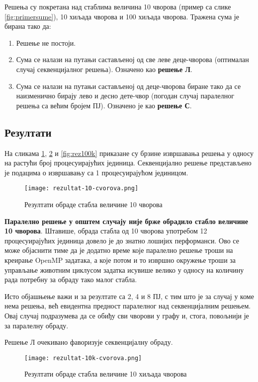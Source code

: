 Решења су покретана над стаблима величина 10 чворова (пример са слике \ref{fig:primersume}), 10 хиљада чворова и 100 хиљада чворова.
Тражена сума је бирана тако да:
\begin{enumerate}
    \item Решење не постоји.
    \item Сума се налази на путањи састављеној од све леве деце-чворова (оптималан случај секвенцијалног решења). Означено као \textbf{решење Л}.
    \item Сума се налази на путањи састављеној од деце-чворова биране тако да се наизменично бирају лево и десно дете-чвор (погодан случај паралелног решења са већим бројем ПЈ).
    Означено је као \textbf{решење С}.
\end{enumerate}

\subsection{Резултати}

На сликама \ref{fig:rez10}, \ref{fig:rez10k} и \ref{fig:rez100k} приказане су брзине извршавања решења у односу на растући број процесуирајућих јединица.
Секвенцијално решење представљено је подацима о извршавању са 1 процесуирајућом јединицом.

\begin{figure}[]
    \centering
    \texttt{[image: rezultat-10-cvorova.png]}
    \caption{Резултати обраде стабла величине 10 чворова}
    \label{fig:rez10}
\end{figure}

\textbf{Паралелно решење у општем случају није брже обрадило стабло величине 10 чворова}.
Штавише, обрада стабла од 10 чворова употребом 12 процесуирајућих јединица довело је до знатно лошијих перформанси.
Ово се може објаснити тиме да је додатно време које паралелно решење троши на креирање OpenMP задатака, а које потом и то извршно окружење троши за
управљање животним циклусом задатка исувише велико у односу на количину рада потребну за обраду тако малог стабла.

Исто објашњење важи и за резултате са 2, 4 и 8 ПЈ, с тим што је за случај у коме нема решења, већ евидентна предност паралелног
над секвенцијалним решењем. Овај случај подразумева да се обиђу сви чворови у графу и, стога, повољнији је за паралелну обраду.

Решење Л очекивано фаворизује секвенцијалну обраду.

\begin{figure}[]
    \centering
    \texttt{[image: rezultat-10k-cvorova.png]}
    \caption{Резултати обраде стабла величине 10 хиљада чворова}
    \label{fig:rez10k}
\end{figure}

